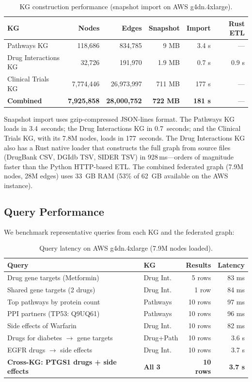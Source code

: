 \documentclass[11pt]{article}
\begin{document}
\begin{table}[H]
\centering
\caption{KG construction performance (snapshot import on AWS g4dn.4xlarge).}
\label{tab:construction}
\small
\begin{tabular}{lrrrrr}
\toprule
\textbf{KG} & \textbf{Nodes} & \textbf{Edges} & \textbf{Snapshot} & \textbf{Import} & \textbf{Rust ETL} \\
\midrule
Pathways KG & 118,686 & 834,785 & 9 MB & 3.4 s & --- \\
Drug Interactions KG & 32,726 & 191,970 & 1.9 MB & 0.7 s & 0.9 s \\
Clinical Trials KG & 7,774,446 & 26,973,997 & 711 MB & 177 s & --- \\
\midrule
\textbf{Combined} & \textbf{7,925,858} & \textbf{28,000,752} & \textbf{722 MB} & \textbf{181 s} & --- \\
\bottomrule
\end{tabular}
\end{table}

Snapshot import uses gzip-compressed JSON-lines format. The Pathways KG loads in 3.4~seconds; the Drug Interactions KG in 0.7~seconds; and the Clinical Trials KG, with its 7.8M nodes, loads in 177~seconds. The Drug Interactions KG also has a Rust native loader that constructs the full graph from source files (DrugBank CSV, DGIdb TSV, SIDER TSV) in 928\,ms---orders of magnitude faster than the Python HTTP-based ETL. The combined federated graph (7.9M nodes, 28M edges) uses 33~GB RAM (53\% of 62~GB available on the AWS instance).

\subsection{Query Performance}

We benchmark representative queries from each KG and the federated graph:

\begin{table}[H]
\centering
\caption{Query latency on AWS g4dn.4xlarge (7.9M nodes loaded).}
\label{tab:queries}
\small
\begin{tabular}{p{5cm}lrr}
\toprule
\textbf{Query} & \textbf{KG} & \textbf{Results} & \textbf{Latency} \\
\midrule
Drug gene targets (Metformin) & Drug Int. & 5 rows & 83 ms \\
Shared gene targets (2 drugs) & Drug Int. & 1 row & 84 ms \\
Top pathways by protein count & Pathways & 10 rows & 97 ms \\
PPI partners (TP53: Q9UQ61) & Pathways & 10 rows & 96 ms \\
Side effects of Warfarin & Drug Int. & 10 rows & 82 ms \\
\midrule
Drugs for diabetes $\rightarrow$ gene targets & Drug+Path & 10 rows & 3.6 s \\
EGFR drugs $\rightarrow$ side effects & Drug Int. & 10 rows & 3.7 s \\
\textbf{Cross-KG: PTGS1 drugs + side effects} & \textbf{All 3} & \textbf{10 rows} & \textbf{3.7 s} \\
\bottomrule
\end{tabular}
\end{table}
\end{document}

